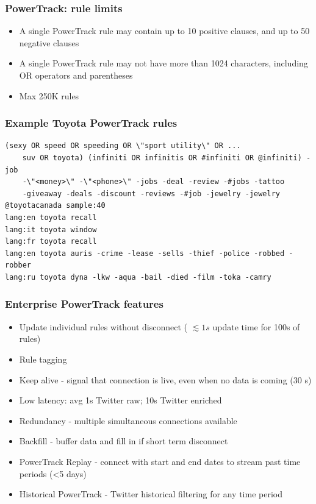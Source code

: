 \documentclass{beamer}
\begin{document}

\begin{frame}\frametitle{PowerTrack: rule limits}
\begin{itemize}
\item A single PowerTrack rule may contain up to 10 positive clauses, and up to 50 negative clauses
\item A single PowerTrack rule may not have more than 1024 characters, including OR operators and parentheses
\item Max 250K rules
\end{itemize}
\end{frame}


\begin{frame}[fragile]\frametitle{Example Toyota PowerTrack rules}
\begin{verbatim}
(sexy OR speed OR speeding OR \"sport utility\" OR ...
    suv OR toyota) (infiniti OR infinitis OR #infiniti OR @infiniti) -job 
    -\"<money>\" -\"<phone>\" -jobs -deal -review -#jobs -tattoo
    -giveaway -deals -discount -reviews -#job -jewelry -jewelry
@toyotacanada sample:40
lang:en toyota recall
lang:it toyota window
lang:fr toyota recall
lang:en toyota auris -crime -lease -sells -thief -police -robbed -robber
lang:ru toyota dyna -lkw -aqua -bail -died -film -toka -camry
\end{verbatim}
\end{frame}

\begin{frame}\frametitle{Enterprise PowerTrack features}
\begin{itemize}
\item Update individual rules without disconnect ( $\lesssim1s$ update time for 100s of rules)
\item Rule tagging
\item Keep alive - signal that connection is live, even when no data is coming (30 s)
\item Low latency: avg 1s Twitter raw; 10s Twitter enriched
\item Redundancy - multiple simultaneous connections available
\item Backfill - buffer data and fill in if short term disconnect
\item PowerTrack Replay - connect with start and end dates to stream past time periods (<5 days)
\item Historical PowerTrack - Twitter historical filtering for any time period
\end{itemize}
\end{frame}
\end{document}
